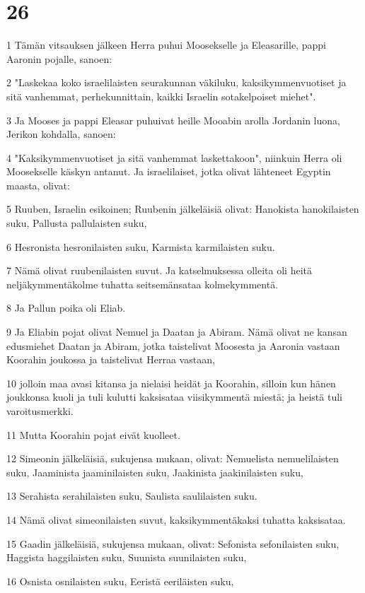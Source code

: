 \chapter{26}

\par 1 Tämän vitsauksen jälkeen Herra puhui Moosekselle ja Eleasarille, pappi Aaronin pojalle, sanoen:
\par 2 "Laskekaa koko israelilaisten seurakunnan väkiluku, kaksikymmenvuotiset ja sitä vanhemmat, perhekunnittain, kaikki Israelin sotakelpoiset miehet".
\par 3 Ja Mooses ja pappi Eleasar puhuivat heille Mooabin arolla Jordanin luona, Jerikon kohdalla, sanoen:
\par 4 "Kaksikymmenvuotiset ja sitä vanhemmat laskettakoon", niinkuin Herra oli Moosekselle käskyn antanut. Ja israelilaiset, jotka olivat lähteneet Egyptin maasta, olivat:
\par 5 Ruuben, Israelin esikoinen; Ruubenin jälkeläisiä olivat: Hanokista hanokilaisten suku, Pallusta pallulaisten suku,
\par 6 Hesronista hesronilaisten suku, Karmista karmilaisten suku.
\par 7 Nämä olivat ruubenilaisten suvut. Ja katselmuksessa olleita oli heitä neljäkymmentäkolme tuhatta seitsemänsataa kolmekymmentä.
\par 8 Ja Pallun poika oli Eliab.
\par 9 Ja Eliabin pojat olivat Nemuel ja Daatan ja Abiram. Nämä olivat ne kansan edusmiehet Daatan ja Abiram, jotka taistelivat Moosesta ja Aaronia vastaan Koorahin joukossa ja taistelivat Herraa vastaan,
\par 10 jolloin maa avasi kitansa ja nielaisi heidät ja Koorahin, silloin kun hänen joukkonsa kuoli ja tuli kulutti kaksisataa viisikymmentä miestä; ja heistä tuli varoitusmerkki.
\par 11 Mutta Koorahin pojat eivät kuolleet.
\par 12 Simeonin jälkeläisiä, sukujensa mukaan, olivat: Nemuelista nemuelilaisten suku, Jaaminista jaaminilaisten suku, Jaakinista jaakinilaisten suku,
\par 13 Serahista serahilaisten suku, Saulista saulilaisten suku.
\par 14 Nämä olivat simeonilaisten suvut, kaksikymmentäkaksi tuhatta kaksisataa.
\par 15 Gaadin jälkeläisiä, sukujensa mukaan, olivat: Sefonista sefonilaisten suku, Haggista haggilaisten suku, Suunista suunilaisten suku,
\par 16 Osnista osnilaisten suku, Eeristä eeriläisten suku,
